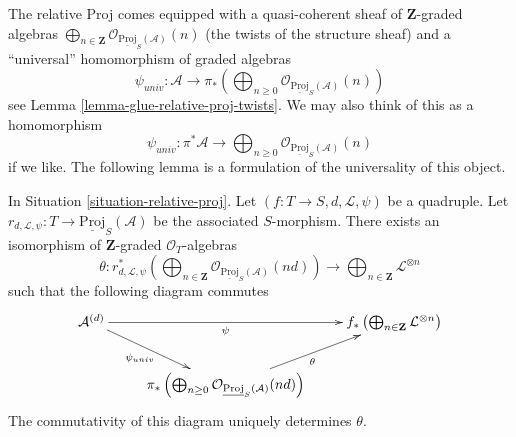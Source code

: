 \noindent
The relative Proj comes equipped with a quasi-coherent
sheaf of $\mathbf{Z}$-graded algebras
$\bigoplus_{n \in \mathbf{Z}}
\mathcal{O}_{\underline{\text{Proj}}_S(\mathcal{A})}(n)$
(the twists of the structure sheaf) and
a ``universal'' homomorphism of graded algebras
$$
\psi_{univ} :
\mathcal{A}
\longrightarrow
\pi_*\left(
\bigoplus\nolimits_{n \geq 0}
\mathcal{O}_{\underline{\text{Proj}}_S(\mathcal{A})}(n)
\right)
$$
see Lemma \ref{lemma-glue-relative-proj-twists}. We may also think of this
as a homomorphism
$$
\psi_{univ} :
\pi^*\mathcal{A}
\longrightarrow
\bigoplus\nolimits_{n \geq 0}
\mathcal{O}_{\underline{\text{Proj}}_S(\mathcal{A})}(n)
$$
if we like. The following lemma is a formulation of the
universality of this object.

\begin{lemma}
\label{lemma-tie-up-psi}
In Situation \ref{situation-relative-proj}.
Let $(f : T \to S, d, \mathcal{L}, \psi)$
be a quadruple. Let
$r_{d, \mathcal{L}, \psi} : T \to \underline{\text{Proj}}_S(\mathcal{A})$
be the associated $S$-morphism.
There exists an isomorphism
of $\mathbf{Z}$-graded $\mathcal{O}_T$-algebras
$$
\theta :
r_{d, \mathcal{L}, \psi}^*\left(
\bigoplus\nolimits_{n \in \mathbf{Z}}
\mathcal{O}_{\underline{\text{Proj}}_S(\mathcal{A})}(nd)
\right)
\longrightarrow
\bigoplus\nolimits_{n \in \mathbf{Z}} \mathcal{L}^{\otimes n}
$$
such that the following diagram commutes
$$
\xymatrix{
\mathcal{A}^{(d)} \ar[rr]_-{\psi}
 \ar[rd]_-{\psi_{univ}} & &
f_*\left(
\bigoplus\nolimits_{n \in \mathbf{Z}}
\mathcal{L}^{\otimes n}
\right) \\
 &
\pi_*\left(
\bigoplus\nolimits_{n \geq 0}
\mathcal{O}_{\underline{\text{Proj}}_S(\mathcal{A})}(nd)
\right) \ar[ru]_\theta
}
$$
The commutativity of this diagram uniquely determines $\theta$.
\end{lemma}

